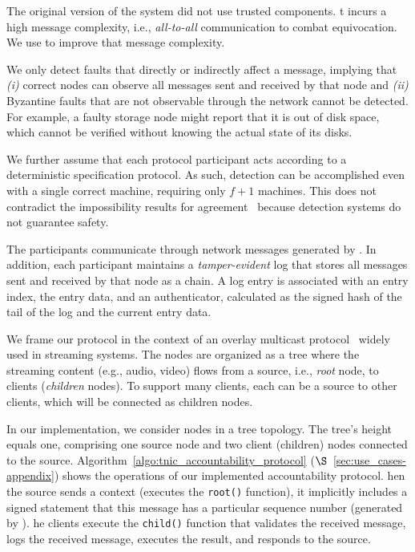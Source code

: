 The original version of the system did not use trusted components. t incurs a high message complexity, i.e., {\em all-to-all} communication to combat equivocation. We use \projecttitle{} to improve that message complexity.

 We only detect faults that directly or indirectly affect a message, implying that {\em (i)} correct nodes 
can observe all messages sent and received by that node and {\em (ii)}  Byzantine faults that are not observable through the network cannot be detected. For example, a faulty storage node might report that it is out of disk space, which cannot be verified without knowing the actual state of its disks.

We further assume that each protocol participant acts according to a deterministic specification protocol. As such, detection can be accomplished even with a single correct machine, requiring only $f+1$ machines.  This does not contradict the impossibility results for agreement~\cite{FLP} because detection systems do not guarantee safety.


 The participants communicate through network messages generated by \projecttitle{}.  In addition, each participant maintains a {\em tamper-evident} log that stores all messages sent and received by that node as a chain. A log entry is associated with an entry index, the entry data, and an authenticator, calculated as the signed hash of the tail of the log and the current entry data. 

We frame our protocol in the context of an overlay multicast protocol~\cite{10.1145/945445.945474} widely used in streaming systems. The nodes are organized as a tree where the streaming content (e.g., audio, video) flows from a source, i.e., {\em root} node, to clients ({\em children} nodes). To support many clients, each can be a source to other clients, which will be connected as children nodes. 

In our implementation, we consider nodes in a tree topology. The tree's height equals one, comprising one source node and two client (children) nodes connected to the source. Algorithm~\ref{algo:tnic_accountability_protocol} ($\S$~\ref{sec:use_cases-appendix}) shows the operations of our implemented accountability protocol.  hen the source sends a context (executes the \texttt{root()} function), it implicitly includes a signed statement that this message has a particular sequence number (generated by \projecttitle{}). he clients execute the {\tt child()} function that validates the received message, logs the received message, executes the result, and responds to the source. 


